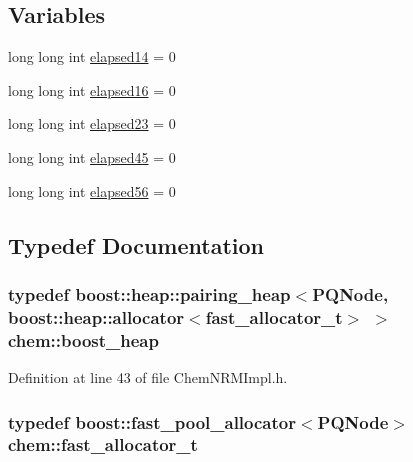 \subsection*{Variables}
\begin{DoxyCompactItemize}
\item 
long long int \hyperlink{namespacechem_ac389831014b55592c5e49626f448b287}{elapsed14} = 0
\item 
long long int \hyperlink{namespacechem_a62660120694a02fc2e5d6f8aef254a00}{elapsed16} = 0
\item 
long long int \hyperlink{namespacechem_a0197cd49bd8ebf45cab3710c9022c08d}{elapsed23} = 0
\item 
long long int \hyperlink{namespacechem_ac3fe333a7580df824dc4f7e827a05528}{elapsed45} = 0
\item 
long long int \hyperlink{namespacechem_a06af82e2b66ef7327fc568000f4a7279}{elapsed56} = 0
\end{DoxyCompactItemize}


\subsection{Typedef Documentation}
\hypertarget{namespacechem_ad3c7e19583b71f442e2d969972ed21f9}{
\subsubsection[{boost\-\_\-heap}]{\setlength{\rightskip}{0pt plus 5cm}typedef boost\-::heap\-::pairing\-\_\-heap$<${\bf P\-Q\-Node}, boost\-::heap\-::allocator$<${\bf fast\-\_\-allocator\-\_\-t}$>$ $>$ {\bf chem\-::boost\-\_\-heap}}}\label{namespacechem_ad3c7e19583b71f442e2d969972ed21f9}


Definition at line 43 of file Chem\-N\-R\-M\-Impl.\-h.

\hypertarget{namespacechem_a98412a4cd9bafe9f3edd66b3a68327a3}{
\subsubsection[{fast\-\_\-allocator\-\_\-t}]{\setlength{\rightskip}{0pt plus 5cm}typedef boost\-::fast\-\_\-pool\-\_\-allocator$<${\bf P\-Q\-Node}$>$ {\bf chem\-::fast\-\_\-allocator\-\_\-t}}}\label{namespacechem_a98412a4cd9bafe9f3edd66b3a68327a3}


